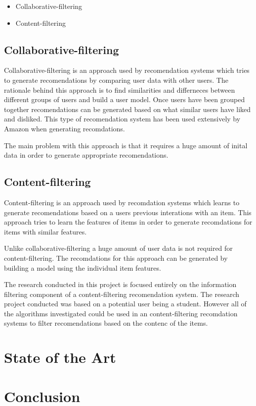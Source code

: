 \begin{itemize}
    \item Collaborative-filtering
    \item Content-filtering
\end{itemize}

\subsection{Collaborative-filtering}
Collaborative-filtering is an approach used by recomendation systems which tries to generate recomendations by comparing user data with other users.
The rationale behind this approach is to find similarities and differneces  between different groups of users and build a user model.
Once users have been grouped together recomendations can be generated based on what similar users have liked and disliked.
This type of recomendation system has been used extensively by Amazon when generating recomdations.

The main problem with this approach is that it requires a huge amount of inital data in order to generate appropriate recomendations.

\subsection{Content-filtering}
Content-filtering is an approach used by recomdation systems which learns to generate recomendations based on a users previous interations with an item.
This approach tries to learn the features of items in order to generate recomdations for items with similar features.

Unlike collaborative-filtering a huge amount of user data is not required for content-filtering.
The recomdations for this approach can be generated by building a model using the individual item features.

The research conducted in this project is focused entirely on the information filtering component of a content-filtering recomendation system.
The research project conducted was based on a potential user being a student.
However all of the algorithms investigated could be used in an content-filtering recomdation systems to filter recomendations based on the contenc of the items.

\section{State of the Art}

\section{Conclusion}
